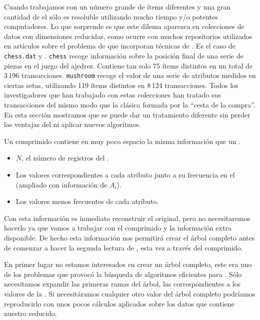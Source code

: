 Cuando trabajamos con un número grande de ítems diferentes y una gran cantidad de \transacciones el \dilemaIR sólo es resoluble utilizando mucho tiempo y/o potentes computadores. Lo que sorprende es que este dilema aparezca en colecciones de datos con dimensiones reducidas, como ocurre con muchos repositorios utilizados en artículos sobre el problema de \Clasificacion que incorporan técnicas de \arm. Es el caso de \texttt{chess.dat} y \mushroom.  \texttt{chess} recoge información sobre la posición final de una serie de piezas en el juego del ajedrez. Contiene tan solo 75 ítems distintos en un total de 3\,196 transacciones. \texttt{mushroom} recoge el valor de una serie de atributos medidos en ciertas setas, utilizando 119
ítems distintos en 8\,124 transacciones. Todos los investigadores que han trabajado con estas colecciones han tratado sus transacciones del mismo modo que la clásica \transaccion formada por la ``cesta de la compra''. En esta sección mostramos que se puede dar un tratamiento diferente sin perder las ventajas del \ARM ni aplicar nuevos algoritmos.









Un \catalogo comprimido contiene en muy poco espacio la misma información que un \catalogo.
\begin{itemize}
   \item $N$, el número de registros del \catalogo.
   \item Los valores correspondientes a cada atributo junto a su frecuencia en el \catalogo (\aprioriC[1] ampliado con información de $A_i$).
   \item Los valores menos frecuentes de cada atributo.
\end{itemize}

Con esta información es inmediato reconstruir el \catalogo original, pero no necesitaremos hacerlo ya que vamos a trabajar con el \catalogo comprimido y la información extra disponible. De hecho esta información nos permitirá crear el árbol \aprioriL completo antes de comenzar a hacer la segunda lectura de \D, esta vez a través del \catalogo comprimido.

En primer lugar no estamos interesados en crear un árbol \aprioriL completo, este era uno de los problemas que provocó la búsqueda de algoritmos eficientes para \ARM. Sólo necesitamos expandir las primeras ramas del árbol, las correspondientes a los valores de la \clase. Si necesitáramos cualquier otro valor del árbol completo podríamos reproducirlo con unos pocos cálculos aplicados sobre los datos que contiene nuestro \aprioriL reducido.

